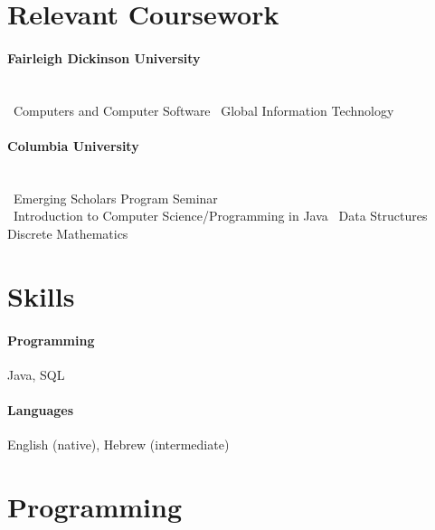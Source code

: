 \documentclass[10pt]{article}
\begin{document}
\section*{Relevant Coursework}

    \paragraph*{Fairleigh Dickinson University}
    \mbox{} \\
    \textbullet \, Computers and Computer Software
    \hfill
    \textbullet \, Global Information Technology

    \paragraph*{Columbia University}
    \mbox{} \\
    \textbullet \, Emerging Scholars Program Seminar
    \\
    \textbullet \, Introduction to Computer Science/Programming in Java
    \hfill
    \textbullet \, Data Structures
    \hfill
    \textbullet \, Discrete Mathematics

                          
\section*{Skills}

    \paragraph*{Programming}
    Java, SQL
    \paragraph*{Languages}
    English (native), Hebrew (intermediate)


\section*{Programming}
\end{document}
